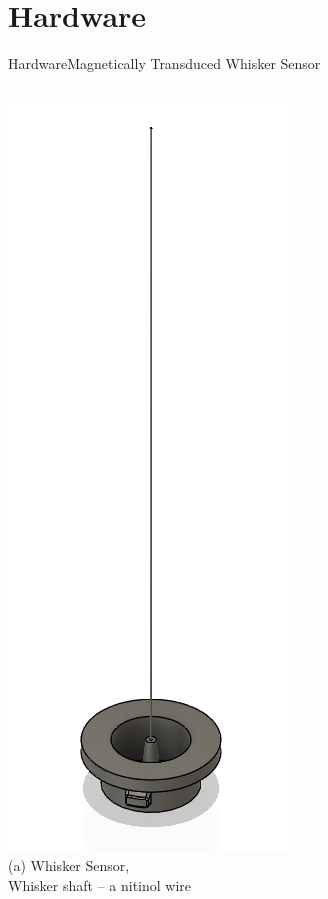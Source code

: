 \documentclass[AIRbeamer
,optEnglish
,optBiber
,optBibstyleAlphabetic
,optBeamerClassicFormat%
]{AIRlatex}
\begin{document}
    \section{Hardware}

    \begin{frame}[c]{Hardware}{Magnetically Transduced Whisker Sensor}
        \begin{columns}[c,onlytextwidth]
            \centering
            \includegraphics[height=0.6\textheight]{figures/whisker}\\
            (a) Whisker Sensor,\\Whisker shaft -- a nitinol wire
            \centering

\end{columns}
\end{frame}
\end{document}

